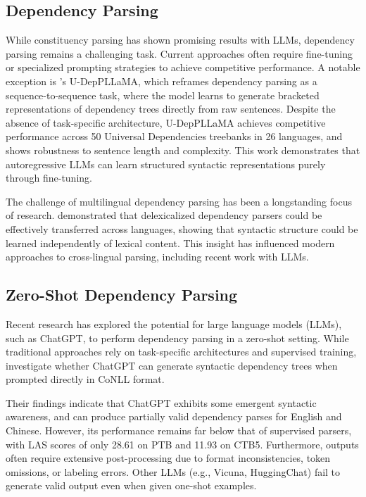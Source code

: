 \subsection{Dependency Parsing}

While constituency parsing has shown promising results with LLMs, dependency parsing remains a challenging task. Current approaches often require fine-tuning or specialized prompting strategies to achieve competitive performance. A notable exception is \citet{hromei2024udeppllama}'s U-DepPLLaMA, which reframes dependency parsing as a sequence-to-sequence task, where the model learns to generate bracketed representations of dependency trees directly from raw sentences. Despite the absence of task-specific architecture, U-DepPLLaMA achieves competitive performance across 50 Universal Dependencies treebanks in 26 languages, and shows robustness to sentence length and complexity. This work demonstrates that autoregressive LLMs can learn structured syntactic representations purely through fine-tuning.

The challenge of multilingual dependency parsing has been a longstanding focus of research. \citet{mcdonald2011multi} demonstrated that delexicalized dependency parsers could be effectively transferred across languages, showing that syntactic structure could be learned independently of lexical content. This insight has influenced modern approaches to cross-lingual parsing, including recent work with LLMs.

\subsection{Zero-Shot Dependency Parsing}

Recent research has explored the potential for large language models (LLMs), such as ChatGPT, to perform dependency parsing in a zero-shot setting. While traditional approaches rely on task-specific architectures and supervised training, \citet{lin2023chatgpt} investigate whether ChatGPT can generate syntactic dependency trees when prompted directly in CoNLL format.

Their findings indicate that ChatGPT exhibits some emergent syntactic awareness, and can produce partially valid dependency parses for English and Chinese. However, its performance remains far below that of supervised parsers, with LAS scores of only 28.61 on PTB and 11.93 on CTB5. Furthermore, outputs often require extensive post-processing due to format inconsistencies, token omissions, or labeling errors. Other LLMs (e.g., Vicuna, HuggingChat) fail to generate valid output even when given one-shot examples.

